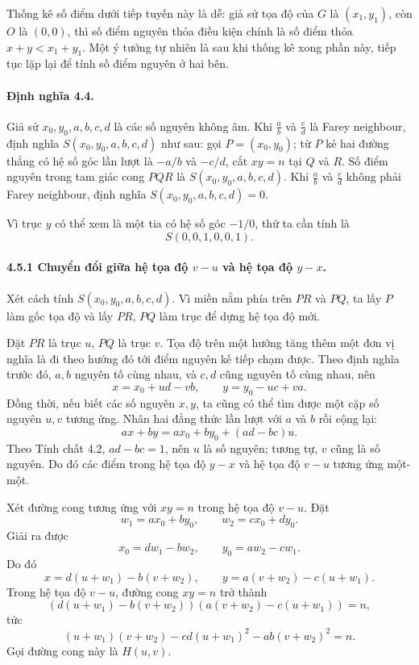 \documentclass[11pt]{article}
\begin{document}
Thống kê số điểm dưới tiếp tuyến này là dễ: giả sử tọa độ của \(G\) là
\((x_1,y_1)\), còn \(O\) là \((0,0)\), thì số điểm nguyên thỏa điều kiện chính
là số điểm thỏa \(x+y<x_1+y_1\). Một ý tưởng tự nhiên là sau khi thống kê xong
phần này, tiếp tục lặp lại để tính số điểm nguyên ở hai bên.

\paragraph{Định nghĩa 4.4.}
Giả sử \(x_0,y_0,a,b,c,d\) là các số nguyên không âm. Khi
\(\frac{a}{b}\) và \(\frac{c}{d}\) là Farey neighbour, định nghĩa
\(S(x_0,y_0,a,b,c,d)\) như sau: gọi \(P=(x_0,y_0)\); từ \(P\) kẻ hai đường
thẳng có hệ số góc lần lượt là \(-a/b\) và \(-c/d\), cắt \(xy=n\) tại \(Q\) và
\(R\). Số điểm nguyên trong tam giác cong \(PQR\) là
\(S(x_0,y_0,a,b,c,d)\). Khi \(\frac{a}{b}\) và \(\frac{c}{d}\) không phải
Farey neighbour, định nghĩa \(S(x_0,y_0,a,b,c,d)=0\).

Vì trục \(y\) có thể xem là một tia có hệ số góc \(-1/0\), thứ ta cần tính là
\[
  S(0,0,1,0,0,1).
\]

\paragraph{4.5.1 Chuyển đổi giữa hệ tọa độ \(v-u\) và hệ tọa độ \(y-x\).}
Xét cách tính \(S(x_0,y_0,a,b,c,d)\). Vì miền nằm phía trên \(PR\) và \(PQ\),
ta lấy \(P\) làm gốc tọa độ và lấy \(PR\), \(PQ\) làm trục để dựng hệ tọa độ
mới.

Đặt \(PR\) là trục \(u\), \(PQ\) là trục \(v\). Tọa độ trên một hướng tăng
thêm một đơn vị nghĩa là đi theo hướng đó tới điểm nguyên kế tiếp chạm được.
Theo định nghĩa trước đó, \(a,b\) nguyên tố cùng nhau, và \(c,d\) cũng nguyên
tố cùng nhau, nên
\[
  x=x_0+ud-vb,\qquad
  y=y_0-uc+va.
\]
Đồng thời, nếu biết các số nguyên \(x,y\), ta cũng có thể tìm được một cặp số
nguyên \(u,v\) tương ứng. Nhân hai đẳng thức lần lượt với \(a\) và \(b\) rồi
cộng lại:
\[
  ax+by=ax_0+by_0+(ad-bc)u.
\]
Theo Tính chất 4.2, \(ad-bc=1\), nên \(u\) là số nguyên; tương tự, \(v\) cũng
là số nguyên. Do đó các điểm trong hệ tọa độ \(y-x\) và hệ tọa độ \(v-u\)
tương ứng một-một.

Xét đường cong tương ứng với \(xy=n\) trong hệ tọa độ \(v-u\). Đặt
\[
  w_1=ax_0+by_0,\qquad w_2=cx_0+dy_0.
\]
Giải ra được
\[
  x_0=dw_1-bw_2,\qquad y_0=aw_2-cw_1.
\]
Do đó
\[
  x=d(u+w_1)-b(v+w_2),\qquad
  y=a(v+w_2)-c(u+w_1).
\]
Trong hệ tọa độ \(v-u\), đường cong \(xy=n\) trở thành
\[
  (d(u+w_1)-b(v+w_2))(a(v+w_2)-c(u+w_1))=n,
\]
tức
\[
  (u+w_1)(v+w_2)-cd(u+w_1)^2-ab(v+w_2)^2=n.
\]
Gọi đường cong này là \(H(u,v)\).
\end{document}
